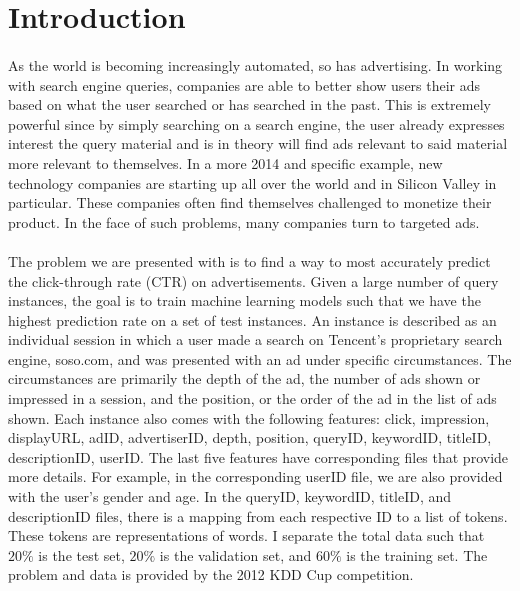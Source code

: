 \documentclass[11pt]{article}
\begin{document}
\maketitle

\section*{Introduction}
\paragraph{}
As the world is becoming increasingly automated, so has advertising. In working with search engine queries, companies are able to better show users their ads based on what the user searched or has searched in the past. This is extremely powerful since by simply searching on a search engine, the user already expresses interest the query material and is in theory will find ads relevant to said material more relevant to themselves. In a more 2014 and specific example, new technology companies are starting up all over the world and in Silicon Valley in particular. These companies often find themselves challenged to monetize their product. In the face of such problems, many companies turn to targeted ads.

\paragraph{}
The problem we are presented with is to find a way to most accurately predict the click-through rate (CTR) on advertisements. Given a large number of query instances, the goal is to train machine learning models such that we have the highest prediction rate on a set of test instances. An instance is described as an individual session in which a user made a search on Tencent's proprietary search engine, soso.com, and was presented with an ad under specific circumstances. The circumstances are primarily the depth of the ad, the number of ads shown or impressed in a session, and the position, or the order of the ad in the list of ads shown. Each instance also comes with the following features: click, impression, displayURL, adID, advertiserID, depth, position, queryID, keywordID, titleID, descriptionID, userID. The last five features have corresponding files that provide more details. For example, in the corresponding userID file, we are also provided with the user's gender and age. In the queryID, keywordID, titleID, and descriptionID files, there is a mapping from each respective ID to a list of tokens. These tokens are representations of words. I separate the total data such that $20\%$ is the test set, $20\%$ is the validation set, and $60\%$ is the training set. The problem and data is provided by the 2012 KDD Cup competition.
\end{document}
